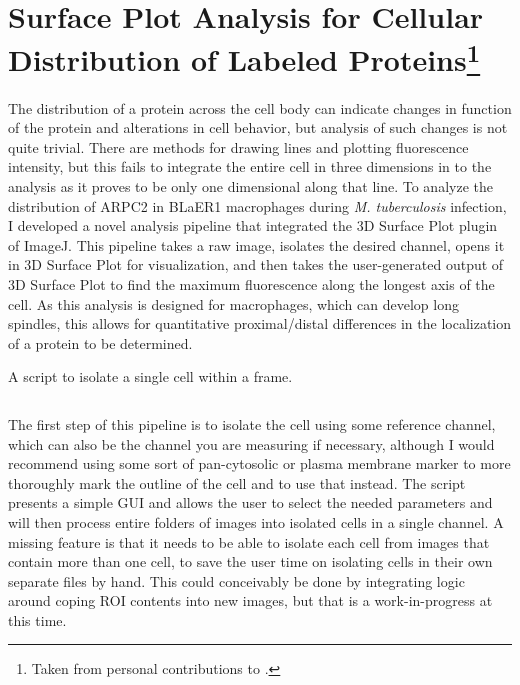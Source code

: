 \section[Surface Plot Analysis for Cellular Distribution of Labeled Proteins]{Surface Plot Analysis for Cellular Distribution of Labeled Proteins\footnote{Taken from personal contributions to \citet{Saelens2022}.}}

The distribution of a protein across the cell body can indicate changes in function of the protein and alterations in cell behavior, but analysis of such changes is not quite trivial. There are methods for drawing lines and plotting fluorescence intensity, but this fails to integrate the entire cell in three dimensions in to the analysis as it proves to be only one dimensional along that line. To analyze the distribution of ARPC2 in BLaER1 macrophages during \textit{M. tuberculosis} infection, I developed a novel analysis pipeline that integrated the 3D Surface Plot plugin of ImageJ. This pipeline takes a raw image, isolates the desired channel, opens it in 3D Surface Plot for visualization, and then takes the user-generated output of 3D Surface Plot to find the maximum fluorescence along the longest axis of the cell. As this analysis is designed for macrophages, which can develop long spindles, this allows for quantitative proximal/distal differences in the localization of a protein to be determined.

\begin{code}
\caption{A script to isolate a single cell within a frame.}
\label{isolator}

\inputminted[breaklines,frame=single,fontsize=\small]{python}{source/autoIsolator.py}

\end{code}

The first step of this pipeline is to isolate the cell using some reference channel, which can also be the channel you are measuring if necessary, although I would recommend using some sort of pan-cytosolic or plasma membrane marker to more thoroughly mark the outline of the cell and to use that instead. The script presents a simple GUI and allows the user to select the needed parameters and will then process entire folders of images into isolated cells in a single channel. A missing feature is that it needs to be able to isolate each cell from images that contain more than one cell, to save the user time on isolating cells in their own separate files by hand. This could conceivably be done by integrating logic around coping ROI contents into new images, but that is a work-in-progress at this time.

